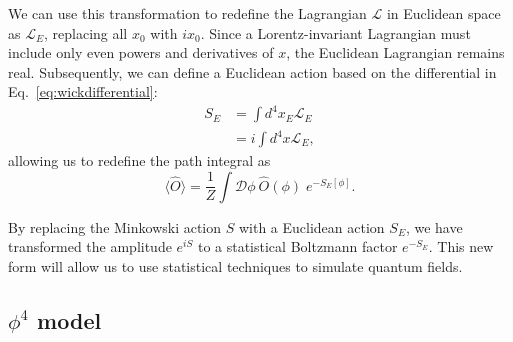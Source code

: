 \documentclass[12pt]{report}
\begin{document}
We can use this transformation to redefine the Lagrangian $\mathcal{L}$ in Euclidean space as $\mathcal{L}_E$, replacing all $x_0$ with $ix_0$. Since a Lorentz-invariant Lagrangian must include only even powers and derivatives of $x$, the Euclidean Lagrangian remains real. Subsequently, we can define a Euclidean action based on the differential in Eq.~\ref{eq:wickdifferential}:
\begin{align}
    S_E &= \int d^4x_E \mathcal{L}_E \\
    &= i \int d^4x \mathcal{L}_E,
\end{align}
allowing us to redefine the path integral as 
\begin{equation}
    \label{eq:pathintegraleuclidean}
    \langle \hat O \rangle = \frac{1}{Z} \int \mathcal{D}\phi \: \hat O (\phi)\; e^{-S_E[\phi]}.
\end{equation}

By replacing the Minkowski action $S$ with a Euclidean action $S_E$, we have transformed the amplitude $e^{iS}$ to a statistical Boltzmann factor $e^{-S_E}$. This new form will allow us to use statistical techniques to simulate quantum fields.

\subsection{$\phi^4$ model}
\label{sec:phi4}
\end{document}
